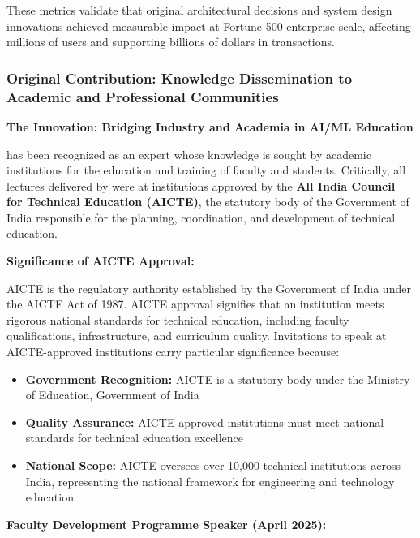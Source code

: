 These metrics validate that \drs original architectural decisions and system design innovations achieved measurable impact at Fortune 500 enterprise scale, affecting millions of users and supporting billions of dollars in transactions.


\subsubsection{Original Contribution: Knowledge Dissemination to Academic and Professional Communities}
\label{original:dissemination}

\textbf{The Innovation: Bridging Industry and Academia in AI/ML Education}

\dr has been recognized as an expert whose knowledge is sought by academic institutions for the education and training of faculty and students. Critically, all lectures delivered by \dr were at institutions approved by the \textbf{All India Council for Technical Education (AICTE)}, the statutory body of the Government of India responsible for the planning, coordination, and development of technical education.

\textbf{Significance of AICTE Approval:}

AICTE is the regulatory authority established by the Government of India under the AICTE Act of 1987. AICTE approval signifies that an institution meets rigorous national standards for technical education, including faculty qualifications, infrastructure, and curriculum quality. Invitations to speak at AICTE-approved institutions carry particular significance because:

\begin{itemize}
    \item \textbf{Government Recognition:} AICTE is a statutory body under the Ministry of Education, Government of India
    \item \textbf{Quality Assurance:} AICTE-approved institutions must meet national standards for technical education excellence
    \item \textbf{National Scope:} AICTE oversees over 10,000 technical institutions across India, representing the national framework for engineering and technology education
\end{itemize}

\textbf{Faculty Development Programme Speaker (April 2025):}

